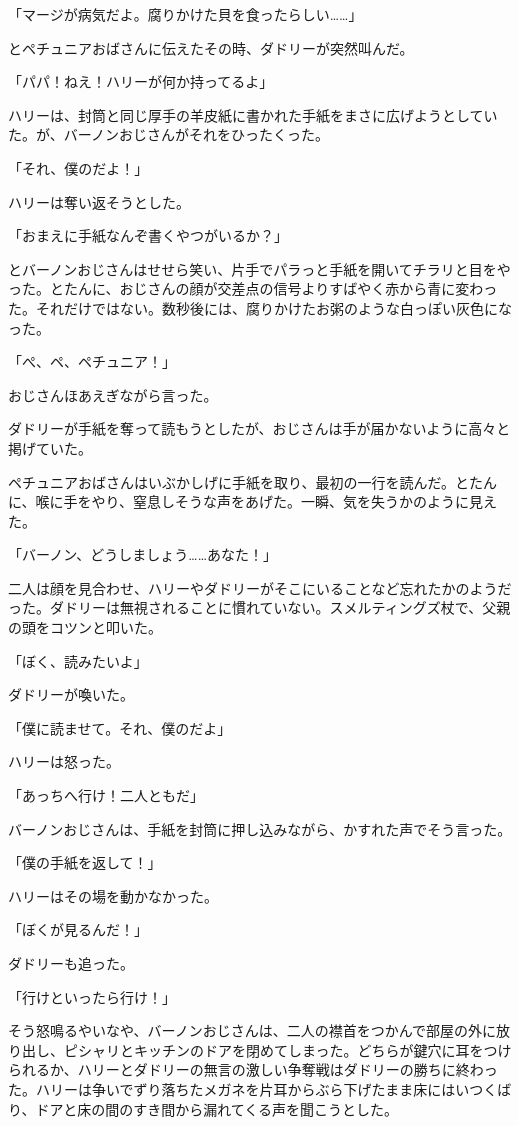 \documentclass[10pt,a4paper]{article}
\begin{document}
\begin{CJK}{UTF8}{min}
「マージが病気だよ。腐りかけた貝を食ったらしい……」

とペチュニアおばさんに伝えたその時、ダドリーが突然叫んだ。

「パパ！ねえ！ハリーが何か持ってるよ」

ハリーは、封筒と同じ厚手の羊皮紙に書かれた手紙をまさに広げようとしていた。が、バーノンおじさんがそれをひったくった。

「それ、僕のだよ！」

ハリーは奪い返そうとした。

「おまえに手紙なんぞ書くやつがいるか？」

とバーノンおじさんはせせら笑い、片手でパラっと手紙を開いてチラリと目をやった。とたんに、おじさんの顔が交差点の信号よりすばやく赤から青に変わった。それだけではない。数秒後には、腐りかけたお粥のような白っぽい灰色になった。

「ぺ、ペ、ペチュニア！」

おじさんほあえぎながら言った。

ダドリーが手紙を奪って読もうとしたが、おじさんは手が届かないように高々と掲げていた。

ペチュニアおばさんはいぶかしげに手紙を取り、最初の一行を読んだ。とたんに、喉に手をやり、窒息しそうな声をあげた。一瞬、気を失うかのように見えた。

「バーノン、どうしましょう……あなた！」

二人は顔を見合わせ、ハリーやダドリーがそこにいることなど忘れたかのようだった。ダドリーは無視されることに慣れていない。スメルティングズ杖で、父親の頭をコツンと叩いた。

「ぼく、読みたいよ」

ダドリーが喚いた。

「僕に読ませて。それ、僕のだよ」

ハリーは怒った。

「あっちへ行け！二人ともだ」

バーノンおじさんは、手紙を封筒に押し込みながら、かすれた声でそう言った。

「僕の手紙を返して！」

ハリーはその場を動かなかった。

「ぼくが見るんだ！」

ダドリーも追った。

「行けといったら行け！」

そう怒鳴るやいなや、バーノンおじさんは、二人の襟首をつかんで部屋の外に放り出し、ピシャリとキッチンのドアを閉めてしまった。どちらが鍵穴に耳をつけられるか、ハリーとダドリーの無言の激しい争奪戦はダドリーの勝ちに終わった。ハリーは争いでずり落ちたメガネを片耳からぶら下げたまま床にはいつくばり、ドアと床の間のすき間から漏れてくる声を聞こうとした。


\end{CJK}
\end{document}
